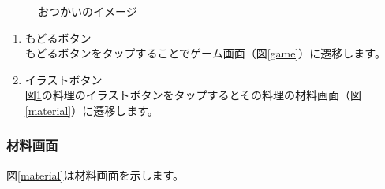\documentclass[a4j]{jarticle}
\begin{document}
\begin{figure}[H]
    \begin{center}
    \caption {おつかいのイメージ}
    \label{otukai1}
    \end{center}
\end{figure}

\begin{enumerate}
  \renewcommand{\labelenumi}{\textcircled{\scriptsize \theenumi}}
\item もどるボタン\\
  もどるボタンをタップすることでゲーム画面（図\ref{game}）に遷移します。
\item イラストボタン\\
  図\ref{otukai1}の料理のイラストボタンをタップするとその料理の材料画面（図\ref{material}）に遷移します。
\end{enumerate}

\newpage
\subsubsection{材料画面}
図\ref{material}は材料画面を示します。\\
\end{document}
